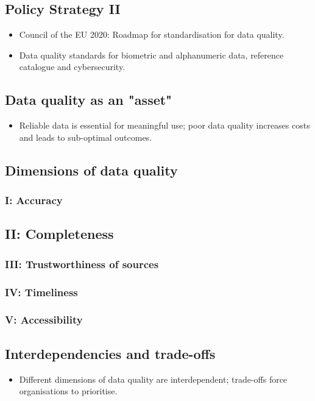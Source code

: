 \documentclass{article}
\begin{document}
\subsection*{Policy Strategy II}
\begin{itemize}
    \item Council of the EU 2020: Roadmap for standardisation for data quality.
    \item Data quality standards for biometric and alphanumeric data, reference catalogue and cybersecurity.
\end{itemize}

\subsection*{Data quality as an "asset"}
\begin{itemize}
    \item Reliable data is essential for meaningful use; poor data quality increases costs and leads to sub-optimal outcomes.
\end{itemize}

\subsection*{Dimensions of data quality}
\subsubsection*{I: Accuracy}
\subsection*{II: Completeness}
\subsubsection*{III: Trustworthiness of sources}
\subsubsection*{IV: Timeliness}
\subsubsection*{V: Accessibility}


\subsection*{Interdependencies and trade-offs}
\begin{itemize}
    \item Different dimensions of data quality are interdependent; trade-offs force organisations to prioritise.
\end{itemize}
\end{document}
